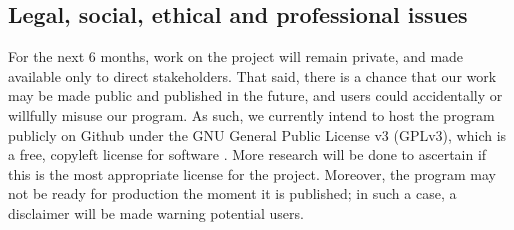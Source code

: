 \subsection{Legal, social, ethical and professional issues}

For the next 6 months, work on the project will remain private, and made available only to direct stakeholders. That said, there is a chance that our work may be made public and published in the future, and users could accidentally or willfully misuse our program. As such, we currently intend to host the program publicly on Github under the GNU General Public License v3 (GPLv3), which is a free, copyleft license for software \cite{GPLv3}. More research will be done to ascertain if this is the most appropriate license for the project. Moreover, the program may not be ready for production the moment it is published; in such a case, a disclaimer will be made warning potential users.
